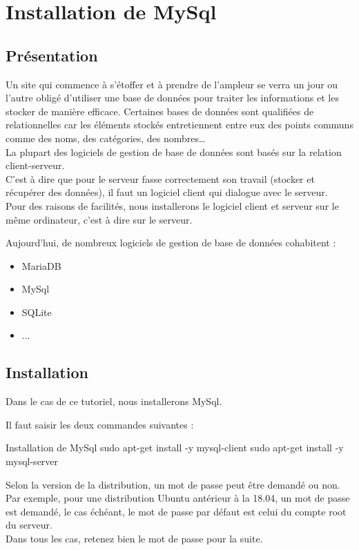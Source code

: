 
\chapter{Installation de MySql}

\section{Présentation}
Un site qui commence à s’étoffer et à prendre de l’ampleur se verra un jour ou l’autre obligé d’utiliser une base de données pour traiter les informations et les stocker de manière efficace. 
Certaines  bases de données sont qualifiées de relationnelles car les éléments stockés entretiennent entre eux des points communs comme des noms, des catégories, des nombres… \\

La plupart des logiciels de gestion de base de données sont basés sur la relation client-serveur.\\
C’est à dire que pour le serveur fasse correctement son travail (stocker et récupérer des données), il faut un logiciel client qui dialogue avec le serveur. \\
Pour des raisons de facilités, nous installerons le logiciel client et serveur sur le même ordinateur, c'est à dire sur le serveur.

Aujourd’hui, de nombreux logiciels de gestion de base de données cohabitent : 

\begin{itemize}
    \item MariaDB
    \item MySql
    \item SQLite
    \item ...
\end{itemize}

\section{Installation}
Dans le cas de ce tutoriel, nous installerons MySql.

Il faut saisir les deux commandes suivantes : 

\begin{Bash}{Installation de MySql}
sudo apt-get install -y mysql-client
sudo apt-get install -y mysql-server
\end{Bash}

Selon la version de la distribution, un mot de passe peut être demandé ou non.
Par exemple, pour une distribution Ubuntu antérieur à la 18.04, un mot de passe est demandé, le cas échéant, le mot de passe par défaut est celui du compte root du serveur. \\
Dans tous les cas, retenez bien le mot de passe pour la suite.

